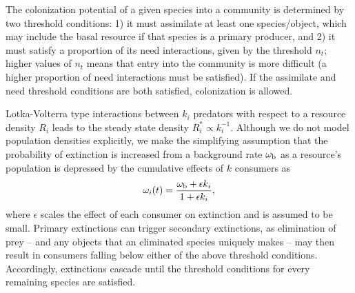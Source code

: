 \documentclass[twocolumn,preprintnumbers,amsmath,amssymb,superscriptaddress]{revtex4}
\begin{document}
The colonization potential of a given species into a community is determined by two threshold conditions:
1) it must assimilate at least one species/object, which may include the basal resource if that species is a primary producer, and
2) it must satisfy a proportion of its need interactions, given by the threshold $n_t$; higher values of $n_t$ means that entry into the community is more difficult (a higher proportion of need interactions must be satisfied).
If the assimilate and need threshold conditions are both satisfied, colonization is allowed.




Lotka-Volterra type interactions between $k_i$ predators with respect to a resource density $R_i$ leads to the steady state density $R_i^* \propto k_i^{-1}$.
Although we do not model population densities explicitly, we make the simplifying assumption that the probability of extinction is increased from a background rate $\omega_{\rm b}$ as a resource's population is depressed by the cumulative effects of $k$ consumers as
\begin{equation}
  \omega_i(t) = \frac{\omega_{\rm b} + \epsilon k_i}{1 + \epsilon k_i},
\end{equation}
where $\epsilon$ scales the effect of each consumer on extinction and is assumed to be small.
Primary extinctions can trigger secondary extinctions, as elimination of prey -- and any objects that an eliminated species uniquely makes -- may then result in consumers falling below either of the above threshold conditions.
Accordingly, extinctions cascade until the threshold conditions for every remaining species are satisfied.
\end{document}
